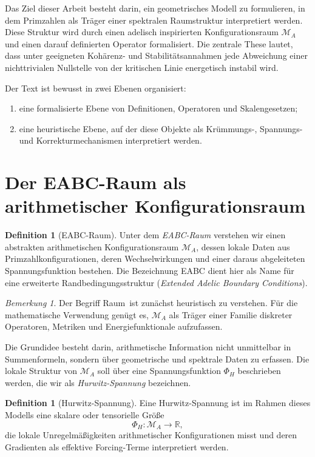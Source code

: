 \documentclass[11pt,a4paper]{article}
\theoremstyle{plain}
\theoremstyle{definition}
\newtheorem{definition}[satz]{Definition}
\theoremstyle{remark}
\newtheorem{bemerkung}[satz]{Bemerkung}
\newcommand{\RR}{\mathbb{R}}
\newcommand{\MA}{\mathcal{M}_A}
\begin{document}
	Das Ziel dieser Arbeit besteht darin, ein geometrisches Modell zu formulieren, in dem Primzahlen als Träger einer spektralen Raumstruktur interpretiert werden. Diese Struktur wird durch einen adelisch inspirierten Konfigurationsraum $\MA$ und einen darauf definierten Operator formalisiert. Die zentrale These lautet, dass unter geeigneten Kohärenz- und Stabilitätsannahmen jede Abweichung einer nichttrivialen Nullstelle von der kritischen Linie energetisch instabil wird.
	
	Der Text ist bewusst in zwei Ebenen organisiert:
	\begin{enumerate}[label=\arabic*.]
		\item eine formalisierte Ebene von Definitionen, Operatoren und Skalengesetzen;
		\item eine heuristische Ebene, auf der diese Objekte als Krümmungs-, Spannungs- und Korrekturmechanismen interpretiert werden.
	\end{enumerate}
	
	\section{Der EABC-Raum als arithmetischer Konfigurationsraum}
	
	\begin{definition}[EABC-Raum]
		Unter dem \emph{EABC-Raum} verstehen wir einen abstrakten arithmetischen Konfigurationsraum $\MA$, dessen lokale Daten aus Primzahlkonfigurationen, deren Wechselwirkungen und einer daraus abgeleiteten Spannungsfunktion bestehen. Die Bezeichnung EABC dient hier als Name für eine erweiterte Randbedingungsstruktur (\emph{Extended Adelic Boundary Conditions}).
	\end{definition}
	
	\begin{bemerkung}
		Der Begriff \glqq Raum\grqq\ ist zunächst heuristisch zu verstehen. Für die mathematische Verwendung genügt es, $\MA$ als Träger einer Familie diskreter Operatoren, Metriken und Energiefunktionale aufzufassen.
	\end{bemerkung}
	
	Die Grundidee besteht darin, arithmetische Information nicht unmittelbar in Summenformeln, sondern über geometrische und spektrale Daten zu erfassen. Die lokale Struktur von $\MA$ soll über eine Spannungsfunktion $\Phi_H$ beschrieben werden, die wir als \emph{Hurwitz-Spannung} bezeichnen.
	
	\begin{definition}[Hurwitz-Spannung]
		Eine Hurwitz-Spannung ist im Rahmen dieses Modells eine skalare oder tensorielle Größe
		\[
		\Phi_H : \MA \to \RR,
		\]
		die lokale Unregelmäßigkeiten arithmetischer Konfigurationen misst und deren Gradienten als effektive Forcing-Terme interpretiert werden.
	\end{definition}
	
\end{document}
